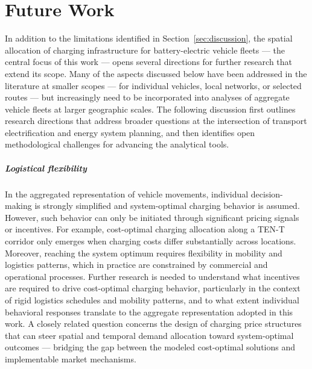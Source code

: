 \chapter{Future Work}\label{ch:futurework}
In addition to the limitations identified in Section~\ref{sec:discussion}, the spatial allocation of charging infrastructure for battery-electric vehicle fleets — the central focus of this work — opens several directions for further research that extend its scope. Many of the aspects discussed below have been addressed in the literature at smaller scopes — for individual vehicles, local networks, or selected routes — but increasingly need to be incorporated into analyses of aggregate vehicle fleets at larger geographic scales. The following discussion first outlines research directions that address broader questions at the intersection of transport electrification and energy system planning, and then identifies open methodological challenges for advancing the analytical tools.

\paragraph*{Logistical flexibility} 

In the aggregated representation of vehicle movements, individual decision-making is strongly simplified and system-optimal charging behavior is assumed. However, such behavior can only be initiated through significant pricing signals or incentives. For example, cost-optimal charging allocation along a TEN-T corridor only emerges when charging costs differ substantially across locations. Moreover, reaching the system optimum requires flexibility in mobility and logistics patterns, which in practice are constrained by commercial and operational processes. Further research is needed to understand what incentives are required to drive cost-optimal charging behavior, particularly in the context of rigid logistics schedules and mobility patterns, and to what extent individual behavioral responses translate to the aggregate representation adopted in this work. A closely related question concerns the design of charging price structures that can steer spatial and temporal demand allocation toward system-optimal outcomes — bridging the gap between the modeled cost-optimal solutions and implementable market mechanisms.

